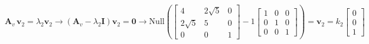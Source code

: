 \documentclass[a4paper, 11pt]{scrartcl}
\begin{document}
$$\bm{A}_v \, \bm{v}_2 = \lambda_2 \bm{v}_2
\rightarrow
(\bm{A}_v - \lambda_2 \bm{I}) \bm{v}_2 = \bm{0}
\rightarrow \text{Null}\left(
\begin{bmatrix}
4 & 2 \sqrt{5} & 0\\
2 \sqrt{5} & 5 & 0\\
0 & 0 & 1
\end{bmatrix}
- 1
\begin{bmatrix}
1 & 0 & 0\\
0 & 1 & 0\\
0 & 0 & 1
\end{bmatrix}
\right) = \bm{v}_2 =
k_2
\begin{bmatrix}
0\\
0\\
1
\end{bmatrix}
$$
\end{document}
